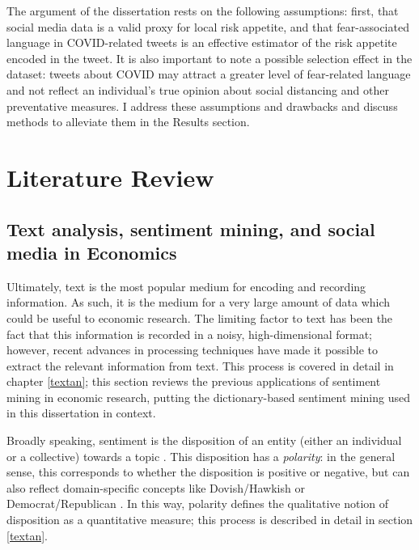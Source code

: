 \documentclass{article}
\begin{document}
The argument of the dissertation rests on the following assumptions: first, that social media data is a valid proxy for local risk appetite, and that fear-associated language in COVID-related tweets is an effective estimator of the risk appetite encoded in the tweet. It is also important to note a possible selection effect in the dataset: tweets about COVID may attract a greater level of fear-related language and not reflect an individual's true opinion about social distancing and other preventative measures. I address these assumptions and drawbacks and discuss methods to alleviate them in the Results section.


\section{Literature Review}
\subsection{Text analysis, sentiment mining, and social media in Economics}\label{sentmining}
Ultimately, text is the most popular medium for encoding and recording information. As such, it is the medium for a very large amount of data which could be useful to economic research. The limiting factor to text has been the fact that this information is recorded in a noisy, high-dimensional format; however, recent advances in processing techniques have made it possible to extract the relevant information from text. This process is covered in detail in chapter \ref{textan}; this section reviews the previous applications of sentiment mining in economic research, putting the dictionary-based sentiment mining used in this dissertation in context.

Broadly speaking, sentiment is the disposition of an entity (either an individual or a collective) towards a topic \parencite{algabaEconometricsMeetsSentiment2020}. This disposition has a \textit{polarity}: in the general sense, this corresponds to whether the disposition is positive or negative, but can also reflect domain-specific concepts like Dovish/Hawkish \parencite{picaultWordsAreNot2017} or Democrat/Republican \parencite{gentzkowWhatDrivesMedia2010}. In this way, polarity defines the qualitative notion of disposition as a quantitative measure; this process is described in detail in section \ref{textan}. 
\end{document}
